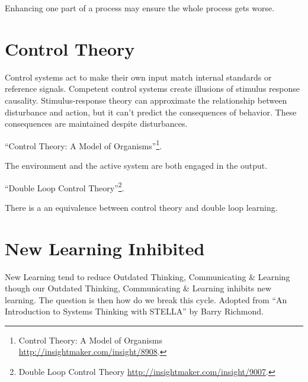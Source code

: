 \documentclass[]{memoir}
\begin{document}
\FloatBarrier 

\begin{model}[frametitle={Model: Swamping Insights}] 

 Enhancing one part of a process may ensure the whole process gets worse.




 \end{model}

\section{Control Theory}

Control systems act to make their own input match internal standards or
reference signals. Competent control systems create illusions of
stimulus response causality. Stimulus-response theory can approximate
the relationship between disturbance and action, but it can't predict
the consequences of behavior. These consequences are maintained despite
disturbances.

``Control Theory: A Model of Organisms''\footnote{Control Theory: A
  Model of Organisms \url{http://insightmaker.com/insight/8908}.}.

\FloatBarrier 

\begin{model}[frametitle={Model: Control Theory: A Model of Organisms}] 

 The environment and the active system are both engaged in the output.




 \end{model}

``Double Loop Control Theory''\footnote{Double Loop Control Theory
  \url{http://insightmaker.com/insight/9007}.}.

\FloatBarrier 

\begin{model}[frametitle={Model: Double Loop Control Theory}] 

 There is a an equivalence between control theory and double loop learning.




 \end{model}

\section{New Learning Inhibited}

New Learning tend to reduce Outdated Thinking, Communicating \& Learning
though our Outdated Thinking, Communicating \& Learning inhibits new
learning. The question is then how do we break this cycle. Adopted from
``An Introduction to Systems Thinking with STELLA'' by Barry Richmond.
\end{document}
